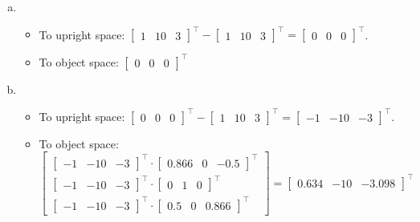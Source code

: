 \documentclass[11pt]{article}
\begin{document}
\begin{enumerate}[a.]
	\item %
	\begin{itemize}
		\item To upright space: $\begin{bmatrix}
				1 & 10 & 3
			\end{bmatrix}^\intercal
			- \begin{bmatrix}
				1 & 10 & 3
			\end{bmatrix}^\intercal
			= \begin{bmatrix}
				0 & 0 & 0
			\end{bmatrix}^\intercal$.
		\item To object space: $\begin{bmatrix}
				0 & 0 & 0
			\end{bmatrix}^\intercal$
	\end{itemize}
	
	\item %
	\begin{itemize}
		\item To upright space: $\begin{bmatrix}
				0 & 0 & 0
			\end{bmatrix}^\intercal
			- \begin{bmatrix}
				1 & 10 & 3
			\end{bmatrix}^\intercal
			= \begin{bmatrix}
				-1 & -10 & -3
			\end{bmatrix}^\intercal$.
		\item To object space: $\begin{bmatrix}
				\begin{bmatrix}
				-1 & -10 & -3
				\end{bmatrix}^\intercal \cdot
				\begin{bmatrix}
					0.866 & 0 & -0.5
				\end{bmatrix}^\intercal \\
				\begin{bmatrix}
				-1 & -10 & -3
				\end{bmatrix}^\intercal \cdot
				\begin{bmatrix}
					0 & 1 & 0
				\end{bmatrix}^\intercal \\
				\begin{bmatrix}
				-1 & -10 & -3
				\end{bmatrix}^\intercal \cdot
				\begin{bmatrix}
					0.5 & 0 & 0.866
				\end{bmatrix}^\intercal
			\end{bmatrix}=
			\begin{bmatrix}
				0.634 & -10 & -3.098
			\end{bmatrix}^\intercal
			$
	\end{itemize}
	

\end{enumerate}
\end{document}
